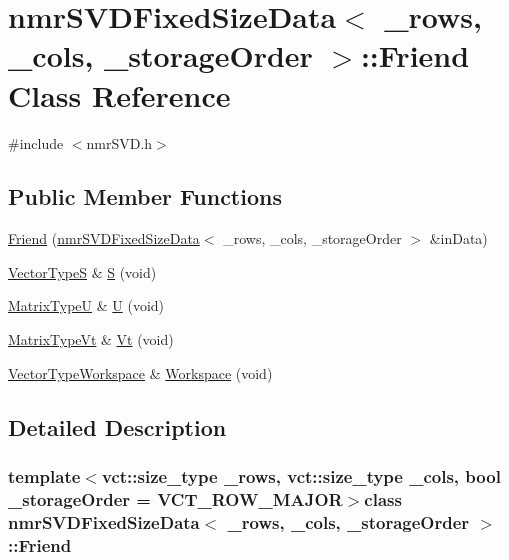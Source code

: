 \hypertarget{classnmr_s_v_d_fixed_size_data_1_1_friend}{}\section{nmr\+S\+V\+D\+Fixed\+Size\+Data$<$ \+\_\+rows, \+\_\+cols, \+\_\+storage\+Order $>$\+:\+:Friend Class Reference}
\label{classnmr_s_v_d_fixed_size_data_1_1_friend}


{\ttfamily \#include $<$nmr\+S\+V\+D.\+h$>$}

\subsection*{Public Member Functions}
\begin{DoxyCompactItemize}
\item 
\hyperlink{classnmr_s_v_d_fixed_size_data_1_1_friend_aa1ebb3b55ee9daf9678376b774c7017c}{Friend} (\hyperlink{classnmr_s_v_d_fixed_size_data}{nmr\+S\+V\+D\+Fixed\+Size\+Data}$<$ \+\_\+rows, \+\_\+cols, \+\_\+storage\+Order $>$ \&in\+Data)
\item 
\hyperlink{classnmr_s_v_d_fixed_size_data_ad9ec4977d4726118af8c7bce3d18b752}{Vector\+Type\+S} \& \hyperlink{classnmr_s_v_d_fixed_size_data_1_1_friend_a8184b00231bcd319b35840c2df86edae}{S} (void)
\item 
\hyperlink{classnmr_s_v_d_fixed_size_data_a164bbc8eccf8b1102d5a85dde45de99d}{Matrix\+Type\+U} \& \hyperlink{classnmr_s_v_d_fixed_size_data_1_1_friend_a85f601c76e92743aaaa50aa868047167}{U} (void)
\item 
\hyperlink{classnmr_s_v_d_fixed_size_data_ab9a7c396f7a83256d5e8c789b3a23591}{Matrix\+Type\+Vt} \& \hyperlink{classnmr_s_v_d_fixed_size_data_1_1_friend_a90ac8632c5537dc4e6def8a117e0ae64}{Vt} (void)
\item 
\hyperlink{classnmr_s_v_d_fixed_size_data_a82162baa88dba7eb39bb52b71435aaa9}{Vector\+Type\+Workspace} \& \hyperlink{classnmr_s_v_d_fixed_size_data_1_1_friend_aa2d609df6ff7790a9600485f7c1b2d7f}{Workspace} (void)
\end{DoxyCompactItemize}


\subsection{Detailed Description}
\subsubsection*{template$<$vct\+::size\+\_\+type \+\_\+rows, vct\+::size\+\_\+type \+\_\+cols, bool \+\_\+storage\+Order = V\+C\+T\+\_\+\+R\+O\+W\+\_\+\+M\+A\+J\+O\+R$>$class nmr\+S\+V\+D\+Fixed\+Size\+Data$<$ \+\_\+rows, \+\_\+cols, \+\_\+storage\+Order $>$\+::\+Friend}

